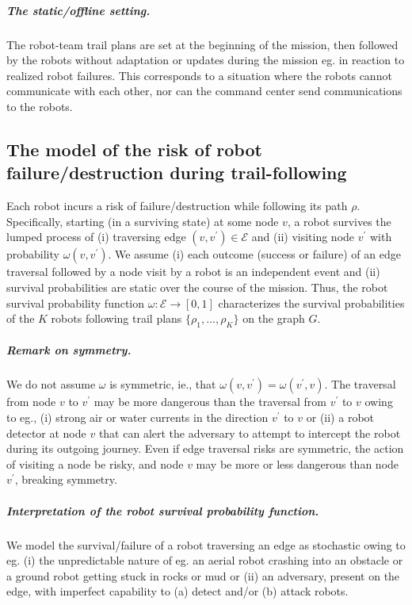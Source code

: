 \documentclass[11pt, oneside]{article}
\begin{document}
\subparagraph{The static/offline setting.} 
The robot-team trail plans are set at the beginning of the mission, then followed by the robots without adaptation or updates during the mission eg. in reaction to realized robot failures. 
This corresponds to a situation where the robots cannot communicate with each other, nor can the command center send communications to the robots. 

\subsection{The model of the risk of robot failure/destruction during trail-following} 
Each robot incurs a risk of failure/destruction while following its path $\rho$. 
Specifically, starting (in a surviving state) at some node $v$, a robot survives the lumped process of (i) traversing edge $(v, v^\prime) \in \mathcal{E}$ and (ii) visiting node $v^\prime$ with probability $\omega(v, v^\prime)$. 
We assume (i) each outcome (success or failure) of an edge traversal followed by a node visit by a robot is an independent event and (ii) survival probabilities are static over the course of the mission. 
Thus, the robot survival probability function $\omega: \mathcal{E} \rightarrow [0, 1]$ characterizes the survival probabilities of the $K$ robots following trail plans $\{\rho_1, ..., \rho_K\}$ on the graph $G$.%

\subparagraph{Remark on symmetry.} We do not assume $\omega$ is symmetric, ie., that $\omega(v, v^\prime) = \omega(v^\prime, v)$. The traversal from node $v$ to $v^\prime$ may be more dangerous than the traversal from $v^\prime$ to $v$ owing to eg., (i) strong air or water currents in the direction $v^\prime$ to $v$ or (ii) a robot detector at node $v$ that can alert the adversary to attempt to intercept the robot during its outgoing journey. Even if edge traversal risks are symmetric, the action of visiting a node be risky, and node $v$ may be more or less dangerous than node $v^\prime$, breaking symmetry. 

\subparagraph{Interpretation of the robot survival probability function.} We model the survival/failure of a robot traversing an edge as stochastic owing to eg. (i) the unpredictable nature of eg. an aerial robot crashing into an obstacle or a ground robot getting stuck in rocks or mud or (ii) an adversary, present on the edge, with imperfect capability to (a) detect and/or (b) attack robots.
\end{document}
